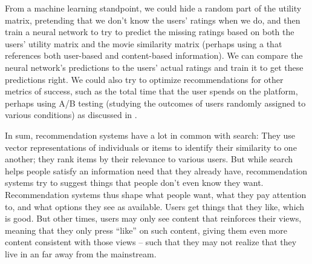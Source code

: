 \begin{table}
    \caption{Feature matrix for movies.}
\end{table}

From a machine learning standpoint, we could hide a random part of the utility matrix, pretending that we don't know the users' ratings when we do, and then train a neural network to try to predict the missing ratings based on both the users' utility matrix and the movie similarity matrix (perhaps using a  that references both user-based and content-based information).  We can compare the neural network's predictions to the users' actual ratings and train it to get these predictions right.  We could also try to optimize recommendations for other metrics of success, such as the total time that the user spends on the platform, perhaps using A/B testing (studying the outcomes of users randomly assigned to various conditions) as discussed in .

In sum, recommendation systems have a lot in common with search: They use vector representations of individuals or items to identify their similarity to one another; they rank items by their relevance to various users.  But while search helps people satisfy an information need that they already have, recommendation systems try to suggest things that people don't even know they want.  Recommendation systems thus shape what people want, what they pay attention to, and what options they see as available.  Users get things that they like, which is good.  But other times,  users may only see content that reinforces their views, meaning that they only press ``like'' on such content, giving them even more content consistent with those views -- such that they may not realize that they live in an  far away from the mainstream.


